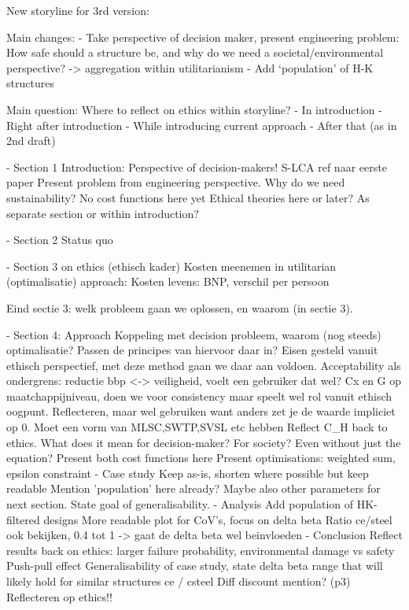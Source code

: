 New storyline for 3rd version:

Main changes:
- Take perspective of decision maker, present engineering problem: How safe should a structure be, and why do we need a societal/environmental perspective? -> aggregation within utilitarianism
- Add `population' of H-K structures

Main question: Where to reflect on ethics within storyline?
- In introduction
- Right after introduction
- While introducing current approach
- After that (as in 2nd draft)

- Section 1 Introduction:
    Perspective of decision-makers!
    S-LCA ref naar eerste paper
    Present problem from engineering perspective. Why do we need sustainability?
    No cost functions here yet
    Ethical theories here or later? As separate section or within introduction?

- Section 2 Status quo

- Section 3 on ethics (ethisch kader)
    Kosten meenemen in utilitarian (optimalisatie) approach:
    Kosten levens: BNP, verschil per persoon

Eind sectie 3: welk probleem gaan we oplossen, en waarom (in sectie 3).


- Section 4: Approach
    Koppeling met decision probleem, waarom (nog steeds) optimalisatie? Passen de principes van hiervoor daar in?
    Eisen gesteld vanuit ethisch perspectief, met deze method gaan we daar aan voldoen.
    Acceptability als ondergrens: reductie bbp <-> veiligheid, voelt een gebruiker dat wel? Cx en G op maatchappijniveau, doen we voor consistency maar speelt wel rol vanuit ethisch oogpunt. Reflecteren, maar wel gebruiken want anders zet je de waarde impliciet op 0. Moet een vorm van MLSC,SWTP,SVSL etc hebben
    Reflect C\_H back to ethics. What does it mean for decision-maker? For society? Even without just the equation?
    Present both cost functions here
    Present optimisations: weighted sum, epsilon constraint
- Case study
    Keep as-is, shorten where possible but keep readable
    Mention 'population' here already? Maybe also other parameters for next section.
    State goal of generalisability.
- Analysis
    Add population of HK-filtered designs
    More readable plot for CoV's, focus on delta beta
    Ratio ce/steel ook bekijken, 0.4 tot 1 -> gaat de delta beta wel beinvloeden
- Conclusion
    Reflect results back on ethics: larger failure probability, environmental damage vs safety
    Push-pull effect
    Generalisability of case study, state delta beta range that will likely hold for similar structures
    ce / csteel
    Diff discount mention? (p3)
    Reflecteren op ethics!!

